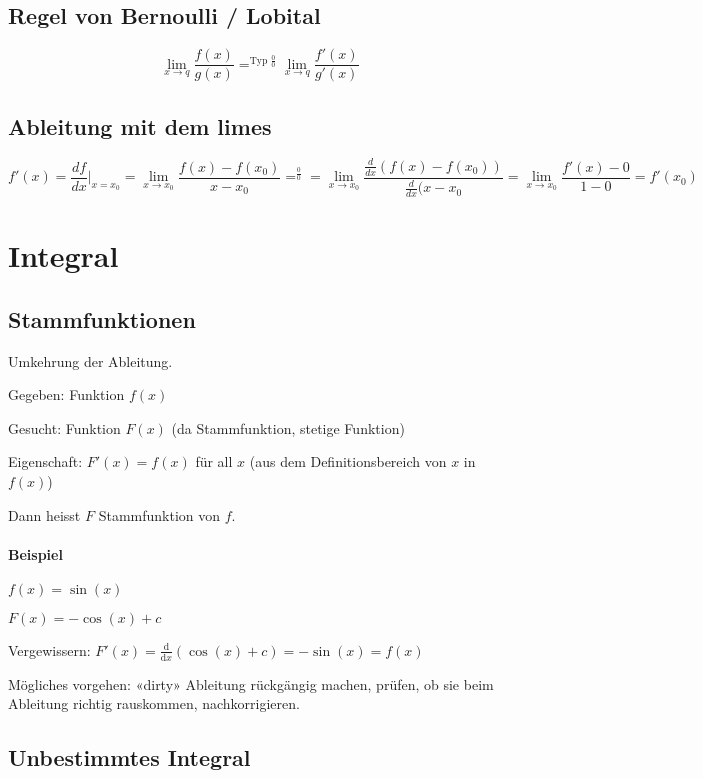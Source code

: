 \subsection{Regel von Bernoulli / Lobital}

\[
	\lim\limits_{x \to q} \frac{f(x)}{g(x)} =^{\text{Typ } \frac{0}{0}} \lim\limits_{x \to q} \frac{f'(x)}{g'(x)} %
\]


\subsection{Ableitung mit dem limes}

\[
	f'(x) = \frac{df}{dx}|_{x=x_0} = \lim\limits_{x \to x_0} \frac{f(x) - f(x_0)}{x - x_0} =^\frac{0}{0} = \lim\limits_{x \to x_0} \frac{\frac{d}{dx}(f(x) - f(x_0))}{\frac{d}{dx}(x - x_0} = \lim\limits_{x \to x_0} \frac{f'(x) -0}{1 - 0} = f'(x_0)
\]

\section{Integral}

\subsection{Stammfunktionen}

Umkehrung der Ableitung.

Gegeben: Funktion $f(x)$

Gesucht: Funktion $F(x)$ (da Stammfunktion, stetige Funktion)

Eigenschaft: $F'(x) = f(x)$ für all $x$ (aus dem Definitionsbereich von $x$ in $f(x)$)

Dann heisst $F$ Stammfunktion von $f$.

\paragraph{Beispiel} \hfill

$f(x) = \sin(x)$

$F(x) = -\cos(x) + c$

Vergewissern: $F'(x) = \frac{\mathrm{d}}{\mathrm{d}x}(\cos(x) + c) = -\sin(x) = f(x)$

Mögliches vorgehen: «dirty» Ableitung rückgängig machen, prüfen, ob sie beim Ableitung richtig rauskommen, nachkorrigieren.

\subsection{Unbestimmtes Integral}

